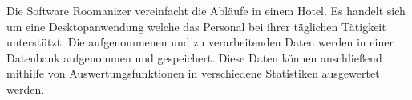 \documentclass[../../Pflichtenheft.tex]{subfiles}
\begin{document}
	Die Software Roomanizer vereinfacht die Abläufe in einem Hotel.
	Es handelt sich um eine Desktopanwendung welche das Personal bei
	ihrer täglichen Tätigkeit unterstützt. Die aufgenommenen und zu
	verarbeitenden Daten werden in einer Datenbank aufgenommen und
	gespeichert. Diese Daten können anschließend mithilfe von 
	Auswertungsfunktionen in verschiedene Statistiken ausgewertet werden.
\end{document}
